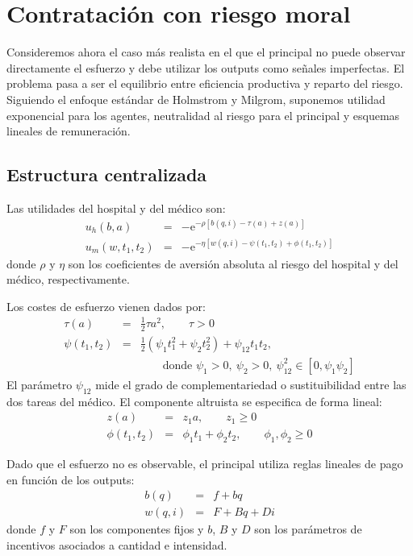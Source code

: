 ﻿\documentclass[12pt,letterpaper]{article}
\newcommand{\e}{\mathrm{e}}
\begin{document}
\section{Contrataci\'on con riesgo moral}
Consideremos ahora el caso m\'as realista en el que el principal no puede observar directamente el esfuerzo y debe utilizar los outputs como se\~nales imperfectas. El problema pasa a ser el equilibrio entre eficiencia productiva y reparto del riesgo. Siguiendo el enfoque est\'andar de Holmstrom y Milgrom, suponemos utilidad exponencial para los agentes, neutralidad al riesgo para el principal y esquemas lineales de remuneraci\'on.

\subsection{Estructura centralizada}
Las utilidades del hospital y del m\'edico son:
\begin{eqnarray*}
  u_h(b,a) &=& -\e^{-\rho[b(q,i)-\tau(a)+z(a)]} \\
  u_m(w,t_1,t_2) &=& -\e^{-\eta[w(q,i)-\psi(t_1,t_2)+\phi(t_1,t_2)]}
\end{eqnarray*}
donde $\rho$ y $\eta$ son los coeficientes de aversi\'on absoluta al riesgo del hospital y del m\'edico, respectivamente.

Los costes de esfuerzo vienen dados por:
\begin{eqnarray*}
  \tau(a) &=& \frac{1}{2}\tau a^2, \qquad \tau>0\\
  \psi(t_1,t_2) &=& \frac{1}{2}(\psi_1t_1^2+\psi_2t_2^2)+\psi_{12}t_1t_2,\\
&& \qquad \text{donde } \psi_1>0,\ \psi_2>0,\ \psi_{12}^2\in[0,\psi_1\psi_2]
\end{eqnarray*}
El par\'ametro $\psi_{12}$ mide el grado de complementariedad o sustituibilidad entre las dos tareas del m\'edico. El componente altruista se especifica de forma lineal:
\begin{eqnarray*}
  z(a) &=& z_1a,\qquad z_1\geq 0\\
  \phi(t_1,t_2) &=& \phi_1t_1+\phi_2t_2,\qquad \phi_1,\phi_2\geq 0
\end{eqnarray*}

Dado que el esfuerzo no es observable, el principal utiliza reglas lineales de pago en funci\'on de los outputs:
\begin{eqnarray*}
  b(q) &=& f+bq \\
  w(q,i) &=& F+Bq+Di
\end{eqnarray*}
donde $f$ y $F$ son los componentes fijos y $b$, $B$ y $D$ son los par\'ametros de incentivos asociados a cantidad e intensidad.
\end{document}
